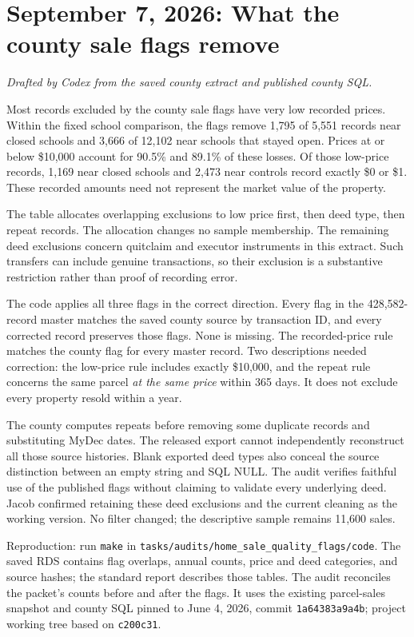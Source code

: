 \section*{September 7, 2026: What the county sale flags remove}
\textit{Drafted by Codex from the saved county extract and published county SQL.}

Most records excluded by the county sale flags have very low recorded prices.
Within the fixed school comparison, the flags remove 1,795 of 5,551 records
near closed schools and 3,666 of 12,102 near schools that stayed open.
Prices at or below \$10,000 account for 90.5\% and 89.1\% of these losses.
Of those low-price records, 1,169 near closed schools and 2,473 near controls
record exactly \$0 or \$1. These recorded amounts need not represent the
market value of the property.

\begin{center}

\end{center}

The table allocates overlapping exclusions to low price first, then deed
type, then repeat records. The allocation changes no sample membership.
The remaining deed exclusions concern quitclaim and executor instruments in
this extract. Such transfers can include genuine transactions, so their
exclusion is a substantive restriction rather than proof of recording error.

The code applies all three flags in the correct direction. Every flag in
the 428,582-record master matches the saved county source by transaction ID,
and every corrected record preserves those flags. None is missing.
The recorded-price rule matches the county flag for every master record.
Two descriptions needed correction: the low-price rule includes exactly
\$10,000, and the repeat rule concerns the same parcel \emph{at the same price}
within 365 days. It does not exclude every property resold within a year.

The county computes repeats before removing some duplicate records and
substituting MyDec dates. The released export cannot independently reconstruct
all those source histories. Blank exported deed types also conceal the
source distinction between an empty string and SQL NULL. The audit verifies
faithful use of the published flags without claiming to validate every
underlying deed. Jacob confirmed retaining these deed exclusions and the current cleaning as the working version. No filter changed; the descriptive sample remains 11,600 sales.

\small
Reproduction: run \texttt{make} in
\texttt{tasks/audits/home\_sale\_quality\_flags/code}.
The saved RDS contains flag overlaps, annual counts, price and deed categories,
and source hashes; the standard report describes those tables. The audit
reconciles the packet's counts before and after the flags. It uses the existing
parcel-sales snapshot and county SQL pinned to June 4, 2026, commit
\texttt{1a64383a9a4b}; project working tree based on \texttt{c200c31}.
\normalsize
